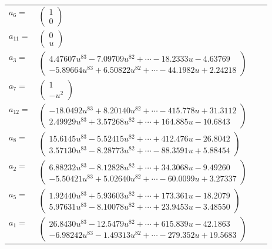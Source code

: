 \documentclass[1p]{elsarticle_modified}
\theoremstyle{definition}
\begin{document}
\begin{tabular}{m{7pt} m{180pt} m{7pt} m{180pt} }
\flushright $a_{6}=$&$\begin{pmatrix}1\\0\end{pmatrix}$ \\
\flushright $a_{11}=$&$\begin{pmatrix}0\\u\end{pmatrix}$ \\
\flushright $a_{3}=$&$\begin{pmatrix}4.47607 u^{83}-7.09709 u^{82}+\cdots-18.2333 u-4.63769\\-5.89664 u^{83}+6.50822 u^{82}+\cdots-44.1982 u+2.24218\end{pmatrix}$ \\
\flushright $a_{7}=$&$\begin{pmatrix}1\\- u^2\end{pmatrix}$ \\
\flushright $a_{12}=$&$\begin{pmatrix}-18.0492 u^{83}+8.20140 u^{82}+\cdots-415.778 u+31.3112\\2.49929 u^{83}+3.57268 u^{82}+\cdots+164.885 u-10.6843\end{pmatrix}$ \\
\flushright $a_{8}=$&$\begin{pmatrix}15.6145 u^{83}-5.52415 u^{82}+\cdots+412.476 u-26.8042\\3.57130 u^{83}-8.28773 u^{82}+\cdots-88.3591 u+5.88454\end{pmatrix}$ \\
\flushright $a_{2}=$&$\begin{pmatrix}6.88232 u^{83}-8.12828 u^{82}+\cdots+34.3068 u-9.49260\\-5.50421 u^{83}+5.02640 u^{82}+\cdots-60.0099 u+3.27337\end{pmatrix}$ \\
\flushright $a_{5}=$&$\begin{pmatrix}1.92440 u^{83}+5.93603 u^{82}+\cdots+173.361 u-18.2079\\5.97631 u^{83}-8.10078 u^{82}+\cdots+23.9453 u-3.48550\end{pmatrix}$ \\
\flushright $a_{1}=$&$\begin{pmatrix}26.8430 u^{83}-12.5479 u^{82}+\cdots+615.839 u-42.1863\\-6.98242 u^{83}-1.49313 u^{82}+\cdots-279.352 u+19.5683\end{pmatrix}$ \\

\end{tabular}
\end{document}
